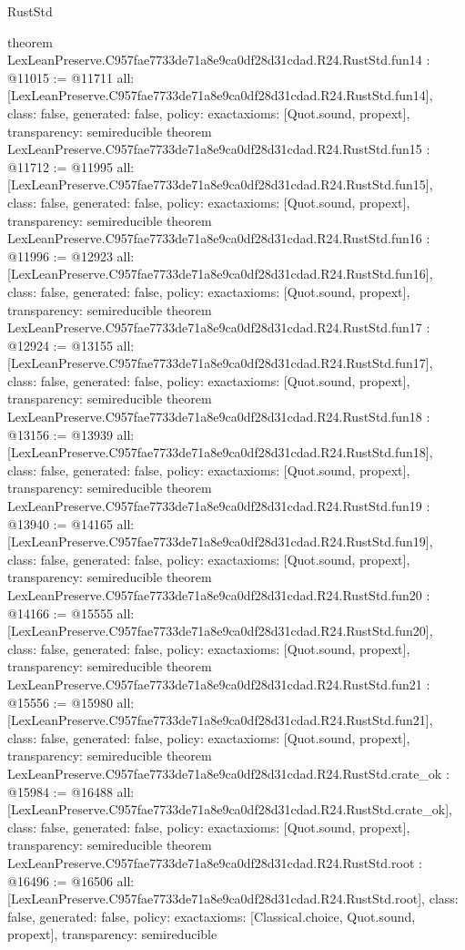 \begin{lexlean}{RustStd}
\begin{coremodule}
{}
theorem LexLeanPreserve.C957fae7733de71a8e9ca0df28d31cdad.R24.RustStd.fun14 : @11015 := @11711 {
  all: [LexLeanPreserve.C957fae7733de71a8e9ca0df28d31cdad.R24.RustStd.fun14],
  class: false,
  generated: false,
  policy: exact{axioms: [Quot.sound, propext]},
  transparency: semireducible
}
theorem LexLeanPreserve.C957fae7733de71a8e9ca0df28d31cdad.R24.RustStd.fun15 : @11712 := @11995 {
  all: [LexLeanPreserve.C957fae7733de71a8e9ca0df28d31cdad.R24.RustStd.fun15],
  class: false,
  generated: false,
  policy: exact{axioms: [Quot.sound, propext]},
  transparency: semireducible
}
theorem LexLeanPreserve.C957fae7733de71a8e9ca0df28d31cdad.R24.RustStd.fun16 : @11996 := @12923 {
  all: [LexLeanPreserve.C957fae7733de71a8e9ca0df28d31cdad.R24.RustStd.fun16],
  class: false,
  generated: false,
  policy: exact{axioms: [Quot.sound, propext]},
  transparency: semireducible
}
theorem LexLeanPreserve.C957fae7733de71a8e9ca0df28d31cdad.R24.RustStd.fun17 : @12924 := @13155 {
  all: [LexLeanPreserve.C957fae7733de71a8e9ca0df28d31cdad.R24.RustStd.fun17],
  class: false,
  generated: false,
  policy: exact{axioms: [Quot.sound, propext]},
  transparency: semireducible
}
theorem LexLeanPreserve.C957fae7733de71a8e9ca0df28d31cdad.R24.RustStd.fun18 : @13156 := @13939 {
  all: [LexLeanPreserve.C957fae7733de71a8e9ca0df28d31cdad.R24.RustStd.fun18],
  class: false,
  generated: false,
  policy: exact{axioms: [Quot.sound, propext]},
  transparency: semireducible
}
theorem LexLeanPreserve.C957fae7733de71a8e9ca0df28d31cdad.R24.RustStd.fun19 : @13940 := @14165 {
  all: [LexLeanPreserve.C957fae7733de71a8e9ca0df28d31cdad.R24.RustStd.fun19],
  class: false,
  generated: false,
  policy: exact{axioms: [Quot.sound, propext]},
  transparency: semireducible
}
theorem LexLeanPreserve.C957fae7733de71a8e9ca0df28d31cdad.R24.RustStd.fun20 : @14166 := @15555 {
  all: [LexLeanPreserve.C957fae7733de71a8e9ca0df28d31cdad.R24.RustStd.fun20],
  class: false,
  generated: false,
  policy: exact{axioms: [Quot.sound, propext]},
  transparency: semireducible
}
theorem LexLeanPreserve.C957fae7733de71a8e9ca0df28d31cdad.R24.RustStd.fun21 : @15556 := @15980 {
  all: [LexLeanPreserve.C957fae7733de71a8e9ca0df28d31cdad.R24.RustStd.fun21],
  class: false,
  generated: false,
  policy: exact{axioms: [Quot.sound, propext]},
  transparency: semireducible
}
theorem LexLeanPreserve.C957fae7733de71a8e9ca0df28d31cdad.R24.RustStd.crate_ok : @15984 := @16488 {
  all: [LexLeanPreserve.C957fae7733de71a8e9ca0df28d31cdad.R24.RustStd.crate_ok],
  class: false,
  generated: false,
  policy: exact{axioms: [Quot.sound, propext]},
  transparency: semireducible
}
theorem LexLeanPreserve.C957fae7733de71a8e9ca0df28d31cdad.R24.RustStd.root : @16496 := @16506 {
  all: [LexLeanPreserve.C957fae7733de71a8e9ca0df28d31cdad.R24.RustStd.root],
  class: false,
  generated: false,
  policy: exact{axioms: [Classical.choice, Quot.sound, propext]},
  transparency: semireducible
}


\end{coremodule}
\end{lexlean}
